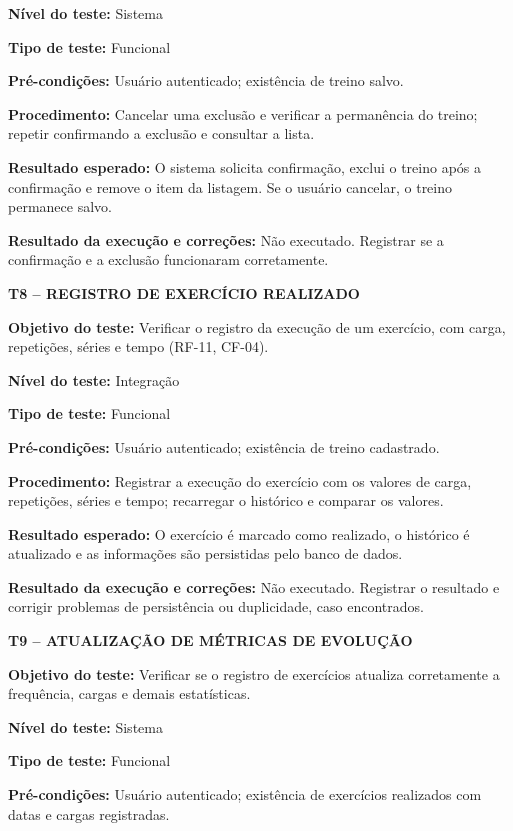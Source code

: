 \noindent\textbf{Nível do teste:} Sistema

\noindent\textbf{Tipo de teste:} Funcional

\noindent\textbf{Pré-condições:} Usuário autenticado; existência de treino salvo.

\noindent\textbf{Procedimento:} Cancelar uma exclusão e verificar a permanência do treino; repetir confirmando a exclusão e consultar a lista.

\noindent\textbf{Resultado esperado:} O sistema solicita confirmação, exclui o treino após a confirmação e remove o item da listagem. Se o usuário cancelar, o treino permanece salvo.

\noindent\textbf{Resultado da execução e correções:} Não executado. Registrar se a confirmação e a exclusão funcionaram corretamente.

\textbf{T8 -- REGISTRO DE EXERCÍCIO REALIZADO}

\noindent\textbf{Objetivo do teste:} Verificar o registro da execução de um exercício, com carga, repetições, séries e tempo (RF-11, CF-04).

\noindent\textbf{Nível do teste:} Integração

\noindent\textbf{Tipo de teste:} Funcional

\noindent\textbf{Pré-condições:} Usuário autenticado; existência de treino cadastrado.

\noindent\textbf{Procedimento:} Registrar a execução do exercício com os valores de carga, repetições, séries e tempo; recarregar o histórico e comparar os valores.

\noindent\textbf{Resultado esperado:} O exercício é marcado como realizado, o histórico é atualizado e as informações são persistidas pelo banco de dados.

\noindent\textbf{Resultado da execução e correções:} Não executado. Registrar o resultado e corrigir problemas de persistência ou duplicidade, caso encontrados.

\textbf{T9 -- ATUALIZAÇÃO DE MÉTRICAS DE EVOLUÇÃO}

\noindent\textbf{Objetivo do teste:} Verificar se o registro de exercícios atualiza corretamente a frequência, cargas e demais estatísticas.

\noindent\textbf{Nível do teste:} Sistema

\noindent\textbf{Tipo de teste:} Funcional

\noindent\textbf{Pré-condições:} Usuário autenticado; existência de exercícios realizados com datas e cargas registradas.

